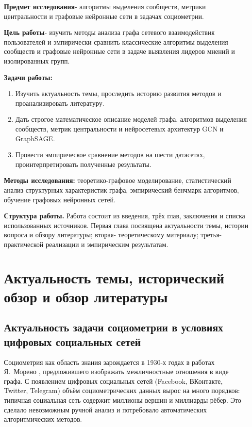 \documentclass[14pt,a4paper]{extarticle}
\begin{document}
\textbf{Предмет исследования}- алгоритмы выделения сообществ, метрики центральности и графовые нейронные сети в задачах социометрии.

\textbf{Цель работы}- изучить методы анализа графа сетевого взаимодействия пользователей и эмпирически сравнить классические алгоритмы выделения сообществ и графовые нейронные сети в задаче выявления лидеров мнений и изолированных групп.

\textbf{Задачи работы:}
\begin{enumerate}
\item Изучить актуальность темы, проследить историю развития методов и проанализировать литературу.
\item Дать строгое математическое описание моделей графа, алгоритмов выделения сообществ, метрик центральности и нейросетевых архитектур GCN и GraphSAGE.
\item Провести эмпирическое сравнение методов на шести датасетах, проинтерпретировать полученные результаты.
\end{enumerate}

\textbf{Методы исследования:} теоретико-графовое моделирование, статистический анализ структурных характеристик графа, эмпирический бенчмарк алгоритмов, обучение графовых нейронных сетей.

\textbf{Структура работы.} Работа состоит из введения, трёх глав, заключения и списка использованных источников. Первая глава посвящена актуальности темы, истории вопроса и обзору литературы; вторая- теоретическому материалу; третья- практической реализации и эмпирическим результатам.

\section{Актуальность темы, исторический обзор и обзор литературы}

\subsection{Актуальность задачи социометрии в условиях цифровых социальных сетей}

Социометрия как область знания зарождается в 1930-х годах в работах Я.~Морено \cite{moreno1934}, предложившего изображать межличностные отношения в виде графа. С появлением цифровых социальных сетей (Facebook, ВКонтакте, Twitter, Telegram) объём социометрических данных вырос на много порядков: типичная социальная сеть содержит миллионы вершин и миллиарды рёбер. Это сделало невозможным ручной анализ и потребовало автоматических алгоритмических методов.
\end{document}
